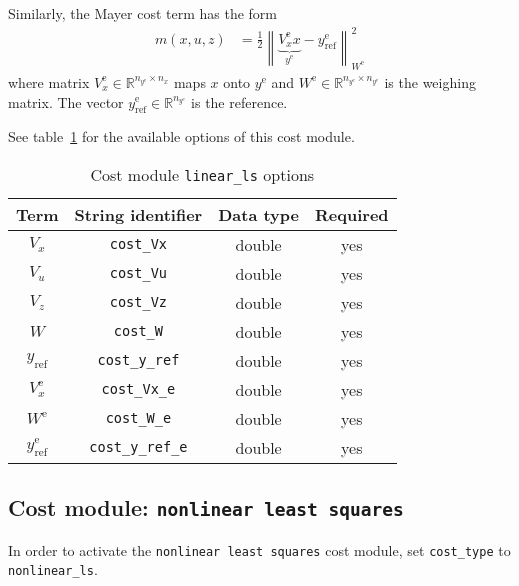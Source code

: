 \documentclass[
a4paper, %
10pt, %
notitlepage,
english]{CSUniSchoolLabReport}
\newcommand{\code}[1]{\texttt{#1}}
\newcommand{\norm}[1]{\left\lVert#1\right\rVert}
\newcommand{\ind}[1]{_{\textrm{#1}}}
\newcommand{\terminal}{^{\textrm{e}}}
\newcommand{\mandatory}{yes}
\begin{document}
\begin{appendices}
Similarly, the Mayer cost term has the form
\begin{align}
	m(x, u, z) &= \frac{1}{2} \norm{ \underbrace{V_x\terminal x}_{\displaystyle y\terminal} - y\ind{ref}\terminal}_{W\terminal}^2 \label{eq:cost:linear_ls:m}
\end{align}
where matrix $ V\terminal_x \in \mathbb{R}^{n_{y\terminal} \times n_x}$ maps $x$ onto $y\terminal$ and $W\terminal \in \mathbb{R}^{n_{y\terminal} \times n_{y\terminal}}$ is the weighing matrix. The vector $y\terminal_\textrm{ref} \in \mathbb{R}^{n_{y\terminal}}$ is the reference.

See table~\ref{tab:cost:linear_ls} for the available options of this cost module.
%
\begin{table}[h!]
	\centering
	\caption{Cost module \code{linear\_ls} options} \label{tab:cost:linear_ls}
	\begin{tabular}{cccc}
		\toprule
		Term & String identifier & Data type & Required \\ \midrule
		$ V_x $ & \code{cost\_Vx}    & double & \mandatory   \\
		$ V_u $ & \code{cost\_Vu}    & double & \mandatory   \\
		$ V_z $ & \code{cost\_Vz}    & double & \mandatory  \\
		$ W $ & \code{cost\_W}    & double & \mandatory  \\
		$ y\ind{ref} $ & \code{cost\_y\_ref}    & double & \mandatory   \\ [1em]
		$ V_x\terminal $ & \code{cost\_Vx\_e}    & double  & \mandatory  \\
		$ W\terminal $ & \code{cost\_W\_e}    & double & \mandatory   \\
		$ y\ind{ref}\terminal $ & \code{cost\_y\_ref\_e}   & double & \mandatory   \\
		\bottomrule
	\end{tabular}
\end{table}
%
\subsection{Cost module: \code{nonlinear least squares}}\label{sec:cost:nonlinear_ls}
%
In order to activate the \code{nonlinear least squares} cost module, set \code{cost\_type} to \code{nonlinear\_ls}.


\end{appendices}
\end{document}
